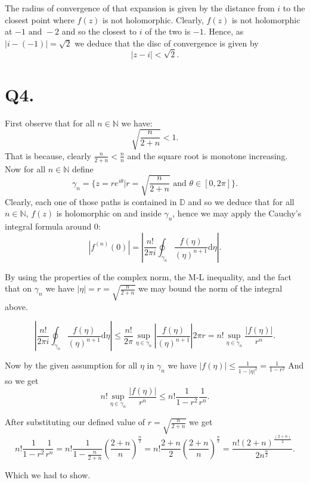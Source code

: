 \documentclass[12pt]{article}
\newcommand\N{\mathbb{N}}
\begin{document}
The radius of convergence of that expansion is given by the distance from $i$ to the closest point where  $f(z)$ is
not holomorphic. Clearly,  $f(z)$ is not holomorphic at  $-1 \text{ and } -2$ and so the closest to $i$ of the two is
$-1$. Hence, as  $|i - (-1)| = \sqrt{2}$  we deduce that the disc of convergence is given by
\[
	|z - i| < \sqrt{2}
.\]

\section*{Q4.}
First observe that for all $n \in \N$ we have:
\[
	\sqrt{\frac{n}{2 + n}} < 1
.\]
That is because, clearly $	\frac{n}{2 + n} < \frac{n}{n} $ and the square root is monotone increasing.
Now for all $n \in \N$ define
\[
	\gamma_n = \{z = re^{i\theta} | r = \sqrt{\frac{n}{2 + n}} \text{ and } \theta \in [0, 2\pi]\}
.\]
Clearly, each one of those paths is contained in $\mathbb{D}$ and so we deduce that for all $n \in \N$, $f(z)$ is
holomorphic on and inside $\gamma_n$, hence we may apply the Cauchy's integral formula around 0:
\[
	|f^{(n)}(0)| = \left|\frac{n !}{2\pi i}\oint_{\gamma_n} \frac{f(\eta)}{(\eta)^{n+1}}\text{d}\eta\right|
.\]

By using the properties of the complex norm, the M-L inequality, and the fact that on
$\gamma_n$ we have  $|\eta| = r = \sqrt{\frac{n}{2 + n}}$ we may bound the norm of the integral above.

\[
	\left|\frac{n !}{2\pi i}\oint_{\gamma_n} \frac{f(\eta)}{(\eta)^{n+1}}\text{d}\eta\right| \leq
	\frac{n !}{2\pi} \sup_{\eta \in \gamma_n} \left|\frac{f(\eta)}{(\eta)^{n+1}}\right|2\pi r =
	n! \sup_{\eta \in \gamma_n} \frac{|f(\eta)|}{r^{n}}
.\]

Now by the given assumption for all $\eta$ in $\gamma_n$ we have
$|f(\eta)| \leq \frac{1}{1 - |\eta|^2} = \frac{1}{1 - r^2}$
And so we get
\[
	n! \sup_{\eta \in \gamma_n} \frac{|f(\eta)|}{r^{n}} \leq n!\frac{1}{1 - r^2}\frac{1}{r^n}
.\]

After substituting our defined value of $r = \sqrt{\frac{n}{2 + n}}$ we get
\[
	n!\frac{1}{1 - r^2}\frac{1}{r^n} = n!\frac{1}{1 - \frac{n}{2+n}}\left(\frac{2+n}{n}\right)^{\frac{n}{2}} =
	n!\frac{2 + n}{2}\left(\frac{2+n}{n}\right)^{\frac{n}{2}} =
	\frac{n!(2+n)^{\frac{(2+n)}{2}}}{2n^{\frac{n}{2}}}
.\]

Which we had to show.
\end{document}
